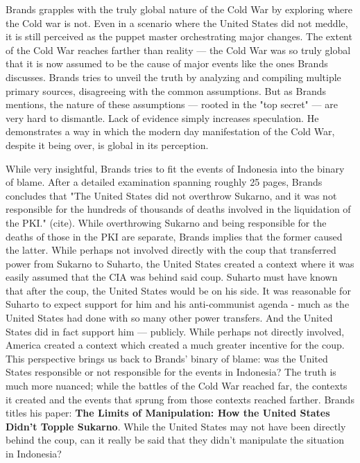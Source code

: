\documentclass[letterpaper]{article}
\begin{document}
Brands grapples with the truly global nature of the Cold War by
exploring where the Cold war is not. Even in a scenario where the United
States did not meddle, it is still perceived as the puppet master
orchestrating major changes. The extent of the Cold War reaches farther
than reality --- the Cold War was so truly global that it is now assumed
to be the cause of major events like the ones Brands discusses. Brands
tries to unveil the truth by analyzing and compiling multiple primary
sources, disagreeing with the common assumptions. But as Brands
mentions, the nature of these assumptions --- rooted in the "top secret"
--- are very hard to dismantle. Lack of evidence simply increases
speculation. He demonstrates a way in which the modern day manifestation
of the Cold War, despite it being over, is global in its perception.

While very insightful, Brands tries to fit the events of Indonesia into
the binary of blame. After a detailed examination spanning roughly 25
pages, Brands concludes that "The United States did not overthrow
Sukarno, and it was not responsible for the hundreds of thousands of
deaths involved in the liquidation of the PKI." (cite). While
overthrowing Sukarno and being responsible for the deaths of those in
the PKI are separate, Brands implies that the former caused the latter.
While perhaps not involved directly with the coup that transferred power
from Sukarno to Suharto, the United States created a context where it
was easily assumed that the CIA was behind said coup. Suharto must have
known that after the coup, the United States would be on his side. It
was reasonable for Suharto to expect support for him and his
anti-communist agenda - much as the United States had done with so many
other power transfers. And the United States did in fact support him ---
publicly. While perhaps not directly involved, America created a context
which created a much greater incentive for the coup. This perspective
brings us back to Brands' binary of blame: was the United States
responsible or not responsible for the events in Indonesia? The truth is
much more nuanced; while the battles of the Cold War reached far, the
contexts it created and the events that sprung from those contexts
reached farther. Brands titles his paper: \textbf{The Limits of Manipulation:
How the United States Didn't Topple Sukarno}. While the United States
may not have been directly behind the coup, can it really be said that
they didn't manipulate the situation in Indonesia?
\end{document}
